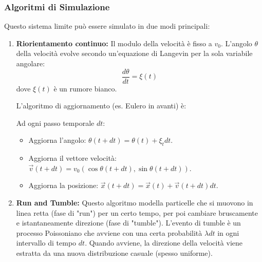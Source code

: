 \subsubsection{Algoritmi di Simulazione}
Questo sistema limite può essere simulato in due modi principali:
\begin{enumerate}
    \item \textbf{Riorientamento continuo:} Il modulo della velocità è fisso a $v_0$. L'angolo $\theta$ della velocità evolve secondo un'equazione di Langevin per la sola variabile angolare:
    \begin{equation}
        \frac{d\theta}{dt} = \xi(t)
    \end{equation}
    dove $\xi(t)$ è un rumore bianco.
    
    L'algoritmo di aggiornamento (es. Eulero in avanti) è:
    
    Ad ogni passo temporale $dt$:
    \begin{itemize}
        \item  Aggiorna l'angolo: $\theta(t+dt) = \theta(t) + \xi_t dt$.
        \item  Aggiorna il vettore velocità: $\vec{v}(t+dt) = v_0 (\cos\theta(t+dt), \sin\theta(t+dt))$.
        \item  Aggiorna la posizione: $\vec{x}(t+dt) = \vec{x}(t) + \vec{v}(t+dt) dt$.
    \end{itemize}

    \item \textbf{Run and Tumble:} Questo algoritmo modella particelle che si muovono in linea retta (fase di "run") per un certo tempo, per poi cambiare bruscamente e istantaneamente direzione (fase di "tumble"). L'evento di tumble è un processo Poissoniano che avviene con una certa probabilità $\lambda dt$ in ogni intervallo di tempo $dt$. Quando avviene, la direzione della velocità viene estratta da una nuova distribuzione casuale (spesso uniforme).
\end{enumerate}
